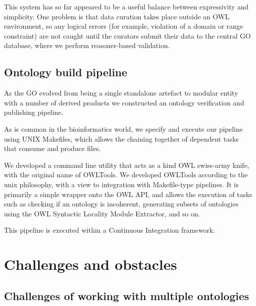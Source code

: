 \documentclass{llncs}
\begin{document}
This system has so far appeared to be a useful balance between
expressivity and simplicity. One problem is that data curation takes
place outside an OWL environment, so any logical errors (for example,
violation of a domain or range constraint) are not caught until the
curators submit their data to the central GO database, where we
perform reasoner-based validation.


\subsection{Ontology build pipeline}

As the GO evolved from being a single standalone artefact to modular
entity with a number of derived products we constructed an ontology
verification and publishing pipeline.

As is common in the bioinformatics world, we specify and execute our
pipeline using UNIX Makefiles, which allows the chaining together of
dependent tasks that consume and produce files.

We developed a command line utility that acts as a kind OWL swiss-army
knife, with the original name of OWLTools\cite{OWLTools}. We developed
OWLTools according to the unix philosophy, with a view to integration
with Makefile-type pipelines. It is primarily a simple wrapper onto
the OWL API, and allows the execution of tasks such as checking if an
ontology is incoherent, generating subsets of ontologies using the OWL
Syntactic Locality Module Extractor, and so on.

This pipeline is executed within a Continuous Integration
framework\cite{Mungall2012a}.

\section{Challenges and obstacles}

\subsection{Challenges of working with multiple ontologies}
\end{document}
